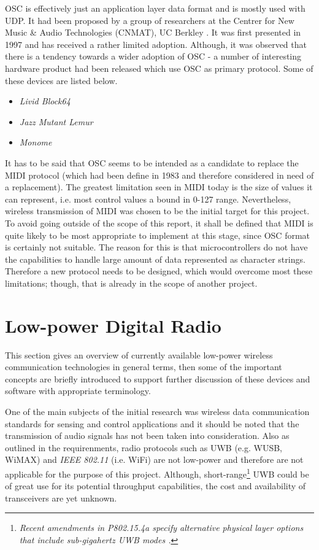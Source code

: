    OSC is effectively just an application layer data format and
  is mostly used with UDP. It had been proposed by a group of
  researchers at the Centrer for New Music \& Audio Technologies
  (CNMAT), UC Berkley \cite{links:cnmat}. It was first presented
  in 1997 \cite{paper:osc97} and has received a rather limited
  adoption. Although, it was observed that there is a tendency
  towards a wider adoption of OSC - a number of interesting
  hardware product had been released which use OSC as primary
  protocol. Some of these devices are listed below.

  \begin{itemize}
  	\item \emph{Livid Block64 \cite{links:livid:block64}}
	\item \emph{Jazz Mutant Lemur \cite{links:jazzmutant:lemur}}
	\item \emph{Monome \cite{links:monome, links:monome:osc}}
  \end{itemize}

  It has to be said that OSC seems to be intended as a candidate
  to replace the MIDI protocol (which had been define in 1983 and
  therefore considered in need of a replacement). The greatest
  limitation seen in MIDI today is the size of values it can
  represent, i.e. most control values a bound in 0-127 range.
  Nevertheless, wireless transmission of MIDI was chosen to
  be the initial target for this project. To avoid going
  outside of the scope of this report, it shall be defined
  that MIDI is quite likely to be most appropriate to implement
  at this stage, since OSC format is certainly not suitable.
  The reason for this is that microcontrollers do not have
  the capabilities to handle large amount of data represented
  as character strings. Therefore a new protocol needs to be
  designed, which would overcome most these limitations; though,
  that is already in the scope of another project.



\section{Low-power Digital Radio}

  This section gives an overview of currently available low-power
 wireless communication technologies in general terms, then some of
 the important concepts are briefly introduced to support further
 discussion of these devices and software with appropriate terminology.

  One of the main subjects of the initial research was wireless data
 communication standards for sensing and control applications and it
 should be noted that the transmission of audio signals has not been
 taken into consideration. Also as outlined in the requirenments,
 radio protocols such as UWB (e.g. WUSB, WiMAX) and \emph{IEEE 802.11}
 (i.e. WiFi) are not low-power and therefore are not applicable for the
 purpose of this project. Although, short-range\footnote{\emph{Recent
 amendments in P802.15.4a specify alternative physical layer options
 that include sub-gigahertz UWB modes \cite{links:wiki:p:wpan}.}} UWB
 could be of great use for its potential throughput capabilities, the
 cost and availability of transceivers are yet unknown.
 
